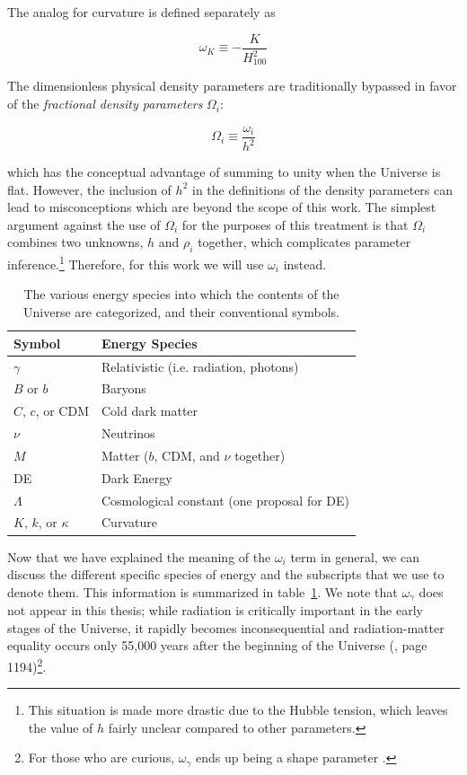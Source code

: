 The analog for curvature is defined separately as

\begin{equation}
\omega_{K} \equiv -\frac{K}{H_{100}^2}
\end{equation}

The dimensionless physical density parameters are traditionally bypassed in
favor of the \textit{fractional density parameters} $\Omega_i$:

\begin{equation}
\Omega_i \equiv \frac{\omega_i}{h^2}
\end{equation} %

which has the conceptual advantage of summing to unity when the Universe is
flat. However, the inclusion of $h^2$ in the definitions of the density
parameters can lead to misconceptions which are beyond the scope of this
work. The simplest argument against the use of $\Omega_i$ for the purposes of
this treatment is that $\Omega_i$ combines two unknowns, $h$ and $\rho_i$
together, which complicates parameter inference.\footnote{This situation is 
made more drastic due to the Hubble tension, which leaves the value of $h$ 
fairly unclear compared to other parameters.} Therefore, for this work we
will use $\omega_i$ instead.


\begin{table}[htb]
\centering
\begin{tabular}{l|l}
\hline
Symbol & Energy Species \\ \hline
$\gamma$ & Relativistic (i.e. radiation, photons) \\
$B$ or $b$ & Baryons \\
$C$, $c$, or CDM & Cold dark matter \\
$\nu$ & Neutrinos \\
$M$ & Matter ($b$, CDM, and $\nu$ together) \\
DE & Dark Energy \\
$\Lambda$ & Cosmological constant (one proposal for DE) \\
$K$, $k$, or $\kappa$ & Curvature \\ \hline
\end{tabular}
 \caption[Energy species symbols]{The various energy species into which the 
 	contents of the Universe are categorized, and their conventional symbols.}
 \label{tab: species_symbols}
\end{table}

Now that we have explained the meaning of the $\omega_i$ term in general, we
can discuss the different specific species of energy and the subscripts that
we use to denote them. This information is summarized in
table~\ref{tab: species_symbols}.
We note that $\omega_\gamma$ does not appear in this thesis;
while radiation is critically important in the early stages of the
Universe, it rapidly becomes inconsequential
and radiation-matter equality occurs only 55,000 years after the
beginning of the Universe (, page 1194)\footnote{For those who are
curious, $\omega_\gamma$ ends up being a shape parameter .}.

